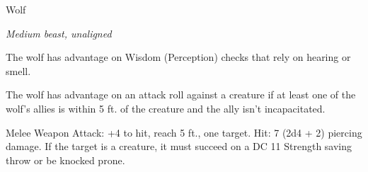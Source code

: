 \begin{monsterbox}{Wolf}
\begin{hangingpar}
\textit{Medium beast, unaligned}
\end{hangingpar}
\dndline%
\basics[%
armorclass = 13,
hitpoints = 2d8 + 2,
speed = {40 ft.}
]
\dndline%
\stats[%
STR = \stat{12},
DEX = \stat{15},
CON = \stat{12},
INT = \stat{3},
WIS = \stat{12},
CHA = \stat{6}
]
\dndline%
\details[%
skills={Stealth +4, Perception +3, },
damageimmunities={},
savingthrows={},
conditionimmunities={},
damageresistances={},
damagevulnerabilities={},
senses={passive Perception 13},
challenge=1/4
]
\dndline%
\begin{monsteraction}
The wolf has advantage on Wisdom (Perception) checks that rely on hearing or smell.
\end{monsteraction}
\begin{monsteraction}
The wolf has advantage on an attack roll against a creature if at least one of the wolf's allies is within 5 ft. of the creature and the ally isn't incapacitated.
\end{monsteraction}
\begin{monsteraction}[Bite]
Melee Weapon Attack: +4 to hit, reach 5 ft., one target. Hit: 7 (2d4 + 2) piercing damage. If the target is a creature, it must succeed on a DC 11 Strength saving throw or be knocked prone.
\end{monsteraction}
\end{monsterbox}